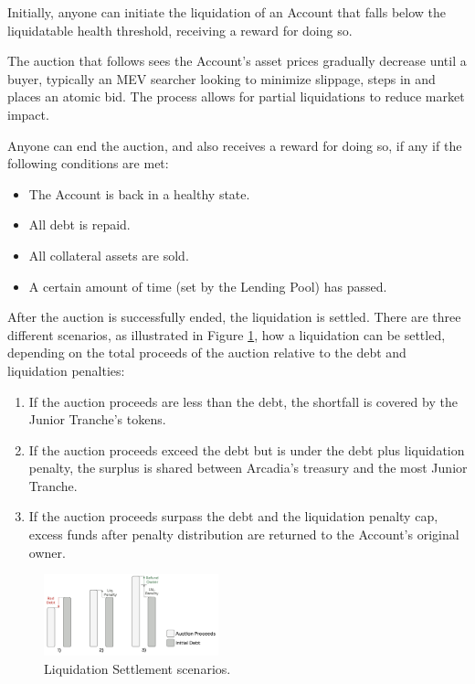 \documentclass[sigconf,nonacm]{acmart}
\begin{document}
Initially, anyone can initiate the liquidation of an Account that falls below the liquidatable health threshold,
receiving a reward for doing so.

The auction that follows sees the Account's asset prices gradually decrease until a buyer,
typically an MEV searcher looking to minimize slippage, steps in and places an atomic bid.
The process allows for partial liquidations to reduce market impact.

Anyone can end the auction, and also receives a reward for doing so, if any if the following conditions are met:
\begin{itemize}
    \item The Account is back in a healthy state.
    \item All debt is repaid.
    \item All collateral assets are sold.
    \item A certain amount of time (set by the Lending Pool) has passed.
\end{itemize}

After the auction is successfully ended, the liquidation is settled.
There are three different scenarios, as illustrated in Figure \ref{fig:liquidation-settlement}, how a liquidation can be settled,
depending on the total proceeds of the auction relative to the debt and liquidation penalties:
\begin{enumerate}
    \item If the auction proceeds are less than the debt,
    the shortfall is covered by the Junior Tranche's tokens.
    \item If the auction proceeds exceed the debt but is under the debt plus liquidation penalty,
    the surplus is shared between Arcadia's treasury and the most Junior Tranche.
    \item If the auction proceeds surpass the debt and the liquidation penalty cap,
    excess funds after penalty distribution are returned to the Account's original owner.
\end{enumerate}

\begin{figure}
    \centering
    \includegraphics[width=0.45\textwidth]{images/Liquidation-Settlement.png}
    \caption{Liquidation Settlement scenarios. \label{fig:liquidation-settlement}}
\end{figure}
\end{document}
